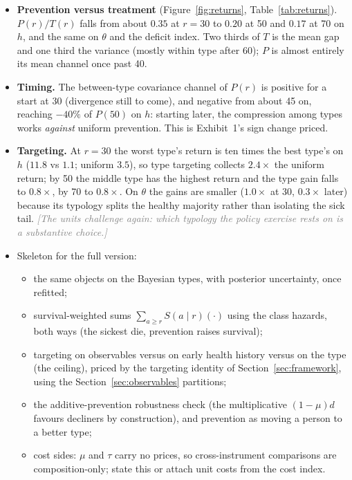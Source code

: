 \documentclass[11pt]{article}
\newcommand{\note}[1]{\textcolor{gray}{\textit{[#1]}}}
\begin{document}
\begin{itemize}
\item \textbf{Prevention versus treatment} (Figure~\ref{fig:returns}, Table~\ref{tab:returns}). $P(r)/T(r)$ falls from about $0.35$ at $r=30$ to $0.20$ at 50 and $0.17$ at 70 on $h$, and the same on $\theta$ and the deficit index. Two thirds of $T$ is the mean gap and one third the variance (mostly within type after 60); $P$ is almost entirely its mean channel once past 40.
\item \textbf{Timing.} The between-type covariance channel of $P(r)$ is positive for a start at 30 (divergence still to come), and negative from about 45 on, reaching $-40\%$ of $P(50)$ on $h$: starting later, the compression among types works \emph{against} uniform prevention. This is Exhibit~1's sign change priced.
\item \textbf{Targeting.} At $r=30$ the worst type's return is ten times the best type's on $h$ ($11.8$ vs $1.1$; uniform $3.5$), so type targeting collects $2.4\times$ the uniform return; by 50 the middle type has the highest return and the type gain falls to $0.8\times$, by 70 to $0.8\times$. On $\theta$ the gains are smaller ($1.0\times$ at 30, $0.3\times$ later) because its typology splits the healthy majority rather than isolating the sick tail. \note{The units challenge again: which typology the policy exercise rests on is a substantive choice.}
\item Skeleton for the full version:
\begin{itemize}
\item the same objects on the Bayesian types, with posterior uncertainty, once refitted;
\item survival-weighted sums $\sum_{a\ge r}S(a\mid r)(\cdot)$ using the class hazards, both ways (the sickest die, prevention raises survival);
\item targeting on observables versus on early health history versus on the type (the ceiling), priced by the targeting identity of Section~\ref{sec:framework}, using the Section~\ref{sec:observables} partitions;
\item the additive-prevention robustness check (the multiplicative $(1-\mu)d$ favours decliners by construction), and prevention as moving a person to a better type;
\item cost sides: $\mu$ and $\tau$ carry no prices, so cross-instrument comparisons are composition-only; state this or attach unit costs from the cost index.
\end{itemize}



\end{itemize}
\end{document}
